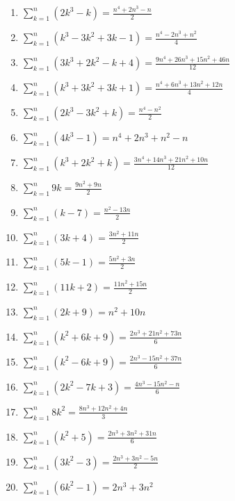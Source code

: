 \documentclass[11pt,a4paper]{article}
\begin{document}
\begin{enumerate}
\item $\displaystyle \sum_{k=1}^{n} \left(2k^{3} - k\right) = \frac{n^{4} + 2n^{3} - n}{2}$
\item $\displaystyle \sum_{k=1}^{n} \left(k^{3} - 3k^{2} + 3k - 1\right) = \frac{n^{4} - 2n^{3} + n^{2}}{4}$
\item $\displaystyle \sum_{k=1}^{n} \left(3k^{3} + 2k^{2} - k + 4\right) = \frac{9n^{4} + 26n^{3} + 15n^{2} + 46n}{12}$
\item $\displaystyle \sum_{k=1}^{n} \left(k^{3} + 3k^{2} + 3k + 1\right) = \frac{n^{4} + 6n^{3} + 13n^{2} + 12n}{4}$
\item $\displaystyle \sum_{k=1}^{n} \left(2k^{3} - 3k^{2} + k\right) = \frac{n^{4} - n^{2}}{2}$
\item $\displaystyle \sum_{k=1}^{n} \left(4k^{3} - 1\right) = n^{4} + 2n^{3} + n^{2} - n$
\item $\displaystyle \sum_{k=1}^{n} \left(k^{3} + 2k^{2} + k\right) = \frac{3n^{4} + 14n^{3} + 21n^{2} + 10n}{12}$
\item $\displaystyle \sum_{k=1}^{n} 9k = \frac{9n^{2} + 9n}{2}$
\item $\displaystyle \sum_{k=1}^{n} \left(k - 7\right) = \frac{n^{2} - 13n}{2}$
\item $\displaystyle \sum_{k=1}^{n} \left(3k + 4\right) = \frac{3n^{2} + 11n}{2}$
\item $\displaystyle \sum_{k=1}^{n} \left(5k - 1\right) = \frac{5n^{2} + 3n}{2}$
\item $\displaystyle \sum_{k=1}^{n} \left(11k + 2\right) = \frac{11n^{2} + 15n}{2}$
\item $\displaystyle \sum_{k=1}^{n} \left(2k + 9\right) = n^{2} + 10n$
\item $\displaystyle \sum_{k=1}^{n} \left(k^{2} + 6k + 9\right) = \frac{2n^{3} + 21n^{2} + 73n}{6}$
\item $\displaystyle \sum_{k=1}^{n} \left(k^{2} - 6k + 9\right) = \frac{2n^{3} - 15n^{2} + 37n}{6}$
\item $\displaystyle \sum_{k=1}^{n} \left(2k^{2} - 7k + 3\right) = \frac{4n^{3} - 15n^{2} - n}{6}$
\item $\displaystyle \sum_{k=1}^{n} 8k^{2} = \frac{8n^{3} + 12n^{2} + 4n}{3}$
\item $\displaystyle \sum_{k=1}^{n} \left(k^{2} + 5\right) = \frac{2n^{3} + 3n^{2} + 31n}{6}$
\item $\displaystyle \sum_{k=1}^{n} \left(3k^{2} - 3\right) = \frac{2n^{3} + 3n^{2} - 5n}{2}$
\item $\displaystyle \sum_{k=1}^{n} \left(6k^{2} - 1\right) = 2n^{3} + 3n^{2}$

\end{enumerate}
\end{document}
